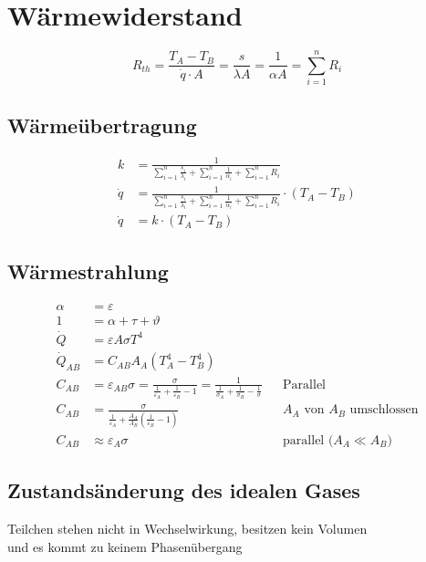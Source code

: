 \section{Wärmewiderstand}
\[R_{th}=\frac{T_A-T_B}{\dot{q}\cdot A}=\frac{s}{\lambda A}=\frac{1}{\alpha A}=\sum_{i=1}^n R_{i}\]

\subsection{Wärmeübertragung}
\begin{align*}
k&=\frac{1}{\sum_{i=1}^n\frac{s_i}{\lambda_i}+\sum_{i=1}^n\frac{1}{\alpha_i}+\sum_{i=1}^n R_{i}}\\
\dot{q}&=\frac{1}{\sum_{i=1}^n\frac{s_i}{\lambda_i}+\sum_{i=1}^n\frac{1}{\alpha_i}+\sum_{i=1}^n R_{i}}\cdot\left(T_A-T_B\right)\\
\dot{q}&=k\cdot\left(T_A-T_B\right)
\end{align*}

\subsection{Wärmestrahlung}
\begin{align*}
\alpha&=\varepsilon\\
1&=\alpha+\tau+\vartheta\\
\dot{Q}&=\varepsilon A \sigma T^4\\
\dot{Q}_{AB}&=C_{AB}A_A\left(T_A^4-T_B^4\right)\\
C_{AB}&=\varepsilon_{AB}\sigma=\frac{\sigma}{\frac{1}{\varepsilon_A}+\frac{1}{\varepsilon_B}-1}=\frac{1}{\frac{1}{\sigma_A}+\frac{1}{\sigma_B}-\frac{1}{\sigma}}&&\text{Parallel}\\
C_{AB}&=\frac{\sigma}{\frac{1}{\varepsilon_A}+\frac{A_A}{A_B}\left(\frac{1}{\varepsilon_B}-1\right)}&&\text{$A_A$ von $A_B$ umschlossen}\\
C_{AB}&\approx\varepsilon_A\sigma&&\text{parallel ($A_A\ll A_B$)}
\end{align*}

\subsection{Zustandsänderung des idealen Gases}
Teilchen stehen nicht in Wechselwirkung, besitzen kein Volumen \\ und es kommt zu keinem Phasenübergang

